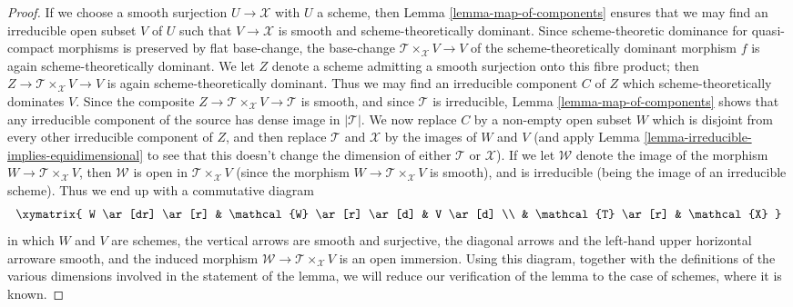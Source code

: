 \begin{proof}
\medskip\noindent
If we choose a smooth surjection $U \to \mathcal{X}$ with $U$ a scheme,
then Lemma \ref{lemma-map-of-components} ensures that
we may find an irreducible open subset $V$ of $U$ such
that $V \to \mathcal{X}$ is smooth and scheme-theoretically dominant.
Since scheme-theoretic dominance for quasi-compact morphisms
is preserved by flat base-change,
the base-change $\mathcal{T} \times_{\mathcal{X}} V \to V$
of the scheme-theoretically
dominant morphism $f$ is again
scheme-theoretically dominant.   We let $Z$ denote a scheme
admitting a smooth surjection onto this fibre product;
then $Z \to \mathcal{T} \times_{\mathcal{X}} V \to V$
is again scheme-theoretically dominant.
Thus we may find an irreducible
component $C$ of $Z$ which scheme-theoretically
dominates $V$.
Since the composite  $Z \to \mathcal{T}\times_{\mathcal{X}} V \to \mathcal{T}$
is smooth,
and since $\mathcal{T}$ is irreducible,
Lemma \ref{lemma-map-of-components} shows that any irreducible
component of the source has dense image in $|\mathcal{T}|$.
We now replace
$C$ by a non-empty open subset $W$ which is disjoint from every other
irreducible component of $Z$, and
then replace $\mathcal{T}$ and $\mathcal{X}$ by the images of $W$
and $V$
(and apply Lemma \ref{lemma-irreducible-implies-equidimensional}
to see that this
doesn't change the dimension of either $\mathcal{T}$ or $\mathcal{X}$).
If we let $\mathcal{W}$ denote the image of the morphism
$W \to \mathcal{T}\times_{\mathcal{X}} V$,
then $\mathcal{W}$ is open in $\mathcal{T}\times_{\mathcal{X}} V$ (since the
morphism $W \to \mathcal{T}\times_{\mathcal{X}} V$ is smooth),
and is irreducible (being the image of an irreducible
scheme).  Thus we end up with a commutative diagram
$$
\xymatrix{
W \ar[dr] \ar[r]  & \mathcal{W} \ar[r] \ar[d]
& V \ar[d] \\ & \mathcal{T} \ar[r] & \mathcal{X}
}
$$
in which $W$ and $V$ are schemes,
the vertical arrows are smooth and surjective,
the diagonal arrows and the left-hand
upper horizontal arroware smooth,
and the induced morphism $\mathcal{W} \to \mathcal{T}\times_{\mathcal{X}} V$ is
an open immersion. Using this diagram, together with the definitions
of the various dimensions involved in
the statement of the lemma, we will reduce our verification
of the lemma to the case of schemes, where it is known.


\end{proof}
